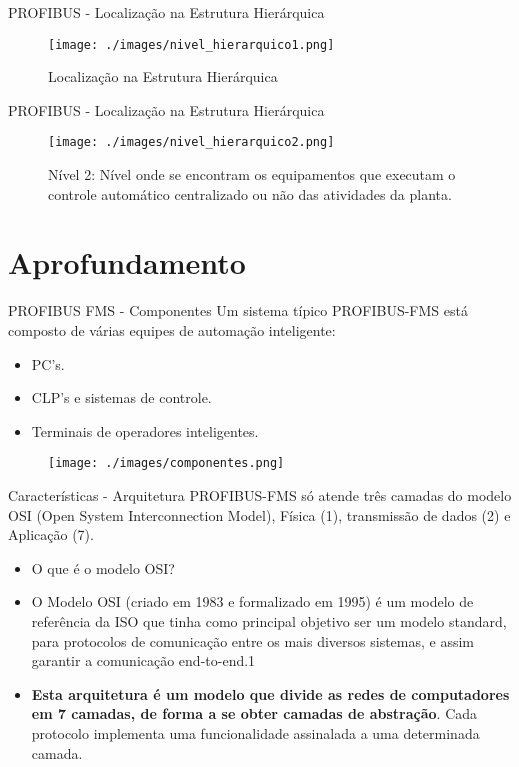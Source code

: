 \documentclass{beamer}
\begin{document}
\begin{frame}{PROFIBUS - Localização na Estrutura Hierárquica}
\begin{figure}
	\texttt{[image: ./images/nivel\_hierarquico1.png]}
	\caption{Localização na Estrutura Hierárquica}
\end{figure}
\end{frame}

\begin{frame}{PROFIBUS - Localização na Estrutura Hierárquica}
\begin{figure}
	\texttt{[image: ./images/nivel\_hierarquico2.png]}
	\caption{Nível 2: Nível onde se encontram os equipamentos que executam o controle automático centralizado ou não das atividades da planta.}
\end{figure}
\end{frame}

\section{Aprofundamento}
\begin{frame}{PROFIBUS FMS - Componentes}
Um sistema típico PROFIBUS-FMS está composto de várias equipes de automação inteligente: 

\begin{itemize}
\item PC's.
\item CLP's e sistemas de controle. 
\item Terminais de operadores inteligentes.
\end{itemize}

\begin{figure}
	\texttt{[image: ./images/componentes.png]}
	\caption*{}
\end{figure}

\end{frame}

\begin{frame}{Características - Arquitetura}
PROFIBUS-FMS só atende três camadas do modelo OSI (Open System Interconnection Model), Física (1), transmissão de dados (2) e Aplicação (7).

\begin{itemize}
\item O que é o modelo OSI?
\pause \item O Modelo OSI (criado em 1983 e formalizado em 1995) é um modelo de referência da ISO que tinha como principal objetivo ser um modelo standard, para protocolos de comunicação entre os mais diversos sistemas, e assim garantir a comunicação end-to-end.1

\pause \item \textbf{Esta arquitetura é um modelo que divide as redes de computadores em 7 camadas, de forma a se obter camadas de abstração}. Cada protocolo implementa uma funcionalidade assinalada a uma determinada camada.
\end{itemize}

\end{frame}
\end{document}
